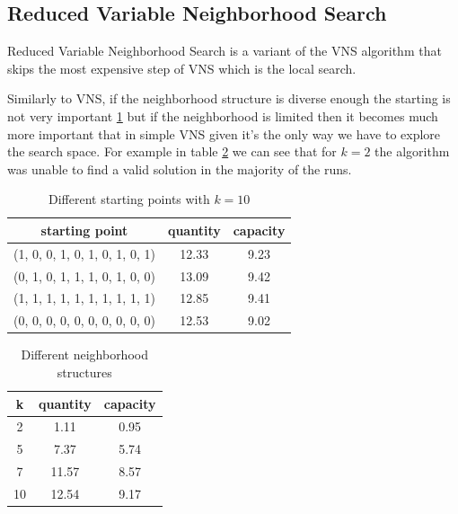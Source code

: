 \subsection{Reduced Variable Neighborhood Search}
Reduced Variable Neighborhood Search is a variant of the VNS algorithm that skips the most expensive step of VNS which is the local search.

Similarly to VNS, if the neighborhood structure is diverse enough the starting is not very important \ref{tab:rvns-start} but if the neighborhood is limited then it becomes much more important that in simple VNS given it's the only way we have to explore the search space. For example in table \ref{tab:rvns-neigh} we can see that for $k=2$ the algorithm was unable to find a valid solution in the majority of the runs.
\begin{table}[H]
    \centering
    \begin{tabular}{c||c |c}
        starting point                 & quantity & capacity \\ \hline
        (1, 0, 0, 1, 0, 1, 0, 1, 0, 1) & 12.33    & 9.23     \\
        (0, 1, 0, 1, 1, 1, 0, 1, 0, 0) & 13.09    & 9.42     \\
        (1, 1, 1, 1, 1, 1, 1, 1, 1, 1) & 12.85    & 9.41     \\
        (0, 0, 0, 0, 0, 0, 0, 0, 0, 0) & 12.53    & 9.02     \\
    \end{tabular}
    \caption{Different starting points with $k=10$}
    \label{tab:rvns-start}
\end{table}
\begin{table}[H]
    \centering
    \begin{tabular}{c||c |c}
        k  & quantity & capacity \\ \hline
        2  & 1.11     & 0.95     \\
        5  & 7.37     & 5.74     \\
        7  & 11.57    & 8.57     \\
        10 & 12.54    & 9.17     \\
    \end{tabular}
    \caption{Different neighborhood structures}
    \label{tab:rvns-neigh}
\end{table}